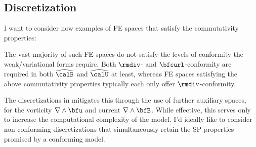 \subsection*{Discretization}
    \begin{remark}
        I want to consider now examples of FE spaces that satisfy the commutativity properties:
        \begin{center}\end{center}
        The vast majority of such FE spaces do not satisfy the levels of conformity the weak/variational forms require. Both $\rmdiv$- and $\bfcurl$-conformity are required in both $\widehat{\calB}$ and $\widehat{\calU}$ at least, whereas FE spaces satisfying the above commutativity properties typically each only offer $\rmdiv$-conformity.
        
        The discretizations in \cite{Laakmann_Hu_Farrell_2022} mitigates this through the use of further auxiliary spaces, for the vorticity $\nabla\wedge\bfu$ and current $\nabla\wedge\bfB$. While effective, this serves only to increase the computational complexity of the model. I'd ideally like to consider non-conforming discretizations that simultaneously retain the SP properties promised by a conforming model.


\end{remark}
